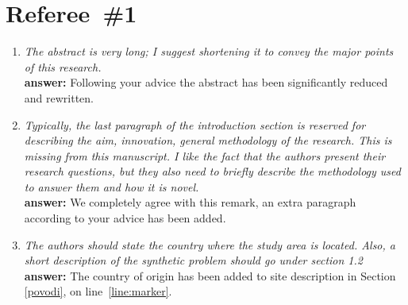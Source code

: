 \documentclass[final,3p, 11pt, a4paper]{elsarticle}
\begin{document}
\section*{Referee~\#1}

\begin{enumerate}
\item {\it    The abstract is very long; I suggest shortening it to convey the major points of this research.} \\
{\bf answer:} Following your advice  the abstract has been significantly reduced and rewritten.

\item {\it Typically, the last paragraph of the introduction section is reserved for describing the aim, innovation, general methodology of the research. This is missing from this manuscript. I like the fact that the authors present their research questions, but they also need to briefly describe the methodology used to answer them and how it is novel.} \\ 
{\bf  answer:} We completely agree with this remark, an extra paragraph according to your advice has been added.

\item {\it The authors should state the country where the study area is located. Also, a short description of the synthetic problem should go under section 1.2} \\
{\bf  answer:} 
The country of origin has been added to site description  in Section \ref{povodi}, on line~\ref{line:marker}.


\end{enumerate}
\end{document}
